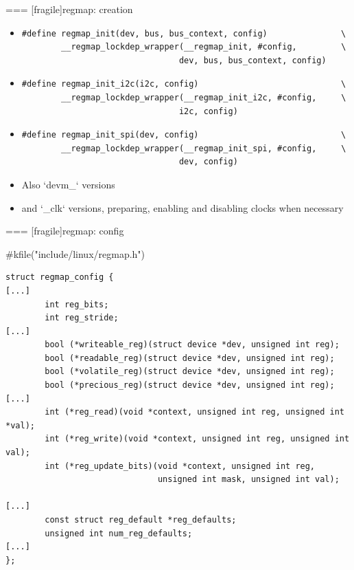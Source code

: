 === [fragile]{regmap: creation}
  \begin{itemize}
    \item 
      \begin{block}{}
        \begin{verbatim}
#define regmap_init(dev, bus, bus_context, config)               \
        __regmap_lockdep_wrapper(__regmap_init, #config,         \
                                dev, bus, bus_context, config)
        \end{verbatim}
      \end{block}
    \item 
      \begin{block}{}
        \begin{verbatim}
#define regmap_init_i2c(i2c, config)                             \
        __regmap_lockdep_wrapper(__regmap_init_i2c, #config,     \
                                i2c, config)
        \end{verbatim}
      \end{block}
    \item 
      \begin{block}{}
        \begin{verbatim}
#define regmap_init_spi(dev, config)                             \
        __regmap_lockdep_wrapper(__regmap_init_spi, #config,     \
                                dev, config)
        \end{verbatim}
      \end{block}
  \end{itemize}
  \begin{itemize}
    \item Also `devm_` versions
    \item and `_clk` versions, preparing, enabling and disabling
      clocks when necessary
  \end{itemize}


=== [fragile]{regmap: config}
  \begin{block}{#kfile("include/linux/regmap.h")}
    \fontsize{9}{9}\selectfont
    \begin{verbatim}
struct regmap_config {
[...]
        int reg_bits;
        int reg_stride;
[...]
        bool (*writeable_reg)(struct device *dev, unsigned int reg);
        bool (*readable_reg)(struct device *dev, unsigned int reg);
        bool (*volatile_reg)(struct device *dev, unsigned int reg);
        bool (*precious_reg)(struct device *dev, unsigned int reg);
[...]
        int (*reg_read)(void *context, unsigned int reg, unsigned int *val);
        int (*reg_write)(void *context, unsigned int reg, unsigned int val);
        int (*reg_update_bits)(void *context, unsigned int reg,
                               unsigned int mask, unsigned int val);

[...]
        const struct reg_default *reg_defaults;
        unsigned int num_reg_defaults;
[...]
};
    \end{verbatim}
  \end{block}


